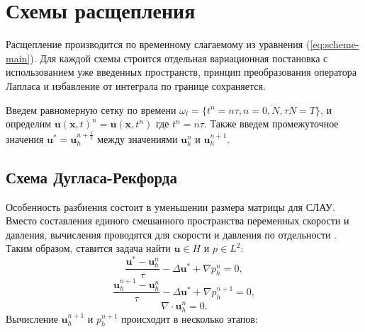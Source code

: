 \documentclass[12pt]{article}
\begin{document}
\section{Схемы расщепления}
Расщепление производится по временному слагаемому из уравнения (\ref{eq:scheme-main}). Для каждой схемы строится отдельная вариационная постановка с использованием уже введенных пространств, принцип преобразования оператора Лапласа и избавление от интеграла по границе сохраняется.

Введем равномерную сетку по времени $\omega_t=\{t^n=n\tau, n=\overline{0,N}, \tau N = T \}$, и определим ${\bm u}({\bm x},t)^n={\bm u}({\bm x}, t^n)$ где $t^n=n\tau$. Также введем промежуточное значения ${\bm u}^*={\bm u}_h^{n+\frac{1}{2}}$ между значениями ${\bm u}_h^n$ и ${\bm u}_h^{n+1}$.

\subsection{Схема Дугласа-Рекфорда}
Особенность разбиения состоит в уменьшении размера матрицы для СЛАУ. Вместо составления единого смешанного пространства переменных скорости и давления, вычисления проводятся для скорости и давления по отдельности \cite{vabishchevich-1999}. Таким образом, ставится задача найти ${\bm u} \in H$ и $p \in L^2$:
\begin{equation} \label{eq:scheme-douglas-1}
\frac{{\bm u}^{*}-{\bm u}_h^n}{\tau} - \Delta {\bm u}^{*}+{\nabla}p_h^n=0,
\end{equation}
\begin{equation} \label{eq:scheme-douglas-2}
\frac{{\bm u}_h^{n+1}-{\bm u}_h^n}{\tau} - \Delta {\bm u}^{*}+{\nabla}p_h^{n+1}=0,
\end{equation}
\begin{equation} \label{eq:scheme-douglas-3}
\nabla \cdot {\bm u}_h^n = 0.
\end{equation}
Вычисление ${\bm u}_h^{n+1}$ и $p_h^{n+1}$ происходит в несколько этапов:
\end{document}
